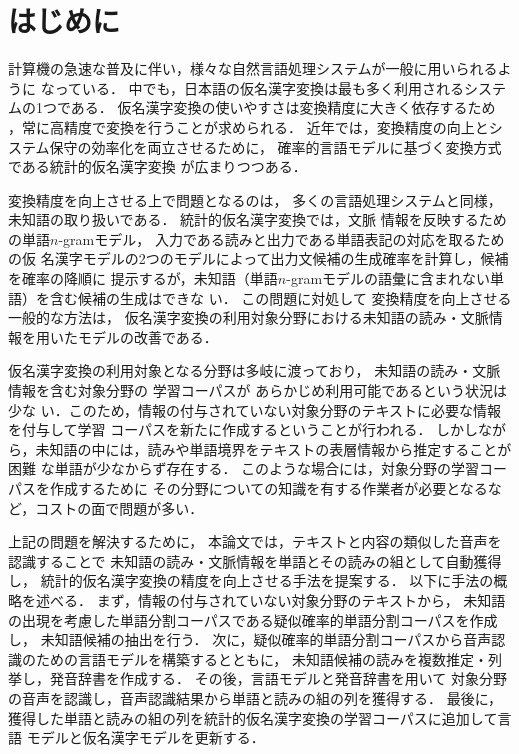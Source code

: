\documentclass[japanese]{jnlp_1.4}
\begin{document}
\maketitle


\section{はじめに}
\label{sect_intro}

計算機の急速な普及に伴い，様々な自然言語処理システムが一般に用いられるように
なっている．
中でも，日本語の仮名漢字変換は最も多く利用されるシステムの1つである．
仮名漢字変換の使いやすさは変換精度に大きく依存するため
，常に高精度で変換を行うことが求められる．
近年では，変換精度の向上とシステム保守の効率化を両立させるために，
確率的言語モデルに基づく変換方式である統計的仮名漢字変換
\cite{確率的モデルによる仮名漢字変換}
が広まりつつある．

変換精度を向上させる上で問題となるのは，
多くの言語処理システムと同様，未知語の取り扱いである．
統計的仮名漢字変換では，文脈
情報を反映するための単語$n$-gramモデル，
入力である読みと出力である単語表記の対応を取るための仮
名漢字モデルの2つのモデルによって出力文候補の生成確率を計算し，候補を確率の降順に
提示するが，未知語（単語$n$-gramモデルの語彙に含まれない単語）を含む候補の生成はできな
い．
この問題に対処して
変換精度を向上させる一般的な方法は，
仮名漢字変換の利用対象分野における未知語の読み・文脈情報を用いたモデルの改善である．


仮名漢字変換の利用対象となる分野は多岐に渡っており，
未知語の読み・文脈情報を含む対象分野の
学習コーパスが
あらかじめ利用可能であるという状況は少な
い．このため，情報の付与されていない対象分野のテキストに必要な情報を付与して学習
コーパスを新たに作成するということが行われる．
しかしながら，未知語の中には，読みや単語境界をテキストの表層情報から推定することが困難
な単語が少なからず存在する．
このような場合には，対象分野の学習コーパスを作成するために
その分野についての知識を有する作業者が必要となるなど，コストの面で問題が多い．


上記の問題を解決するために，
本論文では，テキストと内容の類似した音声を認識することで
未知語の読み・文脈情報を単語とその読みの組として自動獲得し，
統計的仮名漢字変換の精度を向上させる手法を提案する．
以下に手法の概略を述べる．
まず，情報の付与されていない対象分野のテキストから，
未知語の出現を考慮した単語分割コーパスである疑似確率的単語分割コーパスを作成し，
未知語候補の抽出を行う．
次に，疑似確率的単語分割コーパスから音声認識のための言語モデルを構築するとともに，
未知語候補の読みを複数推定・列挙し，発音辞書を作成する．
その後，言語モデルと発音辞書を用いて
対象分野の音声を認識し，音声認識結果から単語と読みの組の列を獲得する．
最後に，獲得した単語と読みの組の列を統計的仮名漢字変換の学習コーパスに追加して言語
モデルと仮名漢字モデルを更新する．
\end{document}
